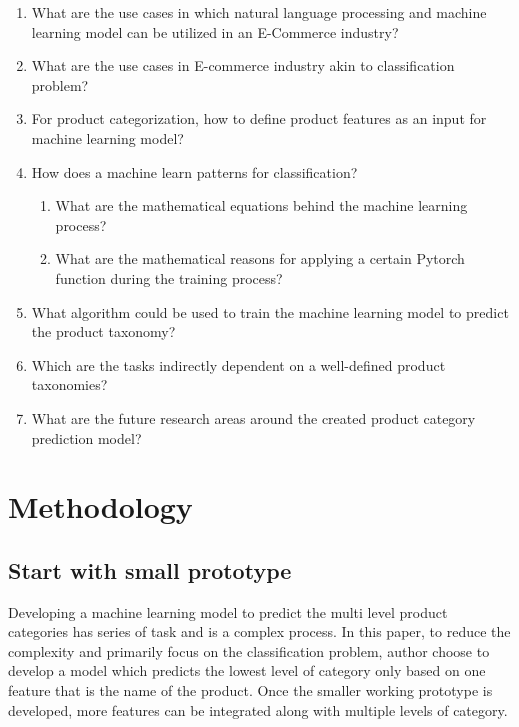 \begin{enumerate}[label=\textbf{RQ\arabic*:}]
    \item What are the use cases in which natural language processing and machine learning model can be utilized in an E-Commerce industry?
    \item What are the use cases in E-commerce industry akin to classification problem?
    \item For product categorization, how to define product features as an input for machine learning model?
    \item How does a machine learn patterns for classification?
    \begin{enumerate}[label=\textbf{SRQ\arabic*:}]
        \item What are the mathematical equations behind the machine learning process?
        \item What are the mathematical reasons for applying a certain Pytorch function during the training process? 
    \end{enumerate}

    \item What algorithm could be used to train the machine learning model to predict the product taxonomy?
    \item Which are the tasks indirectly dependent on a well-defined product taxonomies? 
    \item What are the future research areas around the created product category prediction model?
\end{enumerate}

\section{Methodology}

\subsection{Start with small prototype}

Developing a machine learning model to predict the multi level product categories has series of task and is a complex process. In this paper, to reduce the complexity and primarily focus on the classification problem, author choose to develop a model which predicts the lowest level of category only based on one feature that is the name of the product. Once the smaller working prototype is developed, more features can be integrated along with multiple levels of category. 

